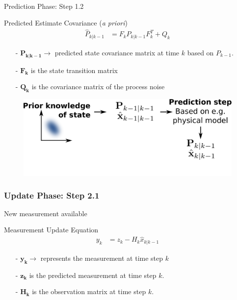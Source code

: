 \documentclass[aspectratio=169,hyperref={pdfpagelabels=false}]{beamer}
\begin{document}
\begin{frame}{Prediction Phase: Step 1.2 }
  
  \begin{block}{Predicted Estimate Covariance (\textit{a priori})}
    \begin{align*}
      \hat{P}_{k|k-1} &= F_{k}P_{k|k-1}F_{k}^T + Q_{k}
      \end{align*}
  \begin{itemize}
    \item[-] $\mathbf{P_{k|k-1}} \rightarrow$ predicted state covariance matrix at time $k$ based on $P_{k-1}$.
    \item[-] $\mathbf{F_{k}}$ is the state transition matrix
    \item[-] $\mathbf{Q_k}$ is the covariance matrix of the process noise
  \end{itemize}
  \end{block}
\end{frame}

\begin{frame}
  \begin{figure}
    \centering
    \includegraphics[width=1\linewidth]{img/4.pdf}
  \end{figure}
\end{frame}

\begin{frame}
  \frametitle{Update Phase: Step 2.1}
  New measurement available
  \begin{block}{Measurement Update Equation}
    \begin{align*}
      y_{k} &= z_{k} - H_{k}\hat{x}_{k|k-1}
      \end{align*}
      \begin{itemize}
        \item[-] $\mathbf{y_k} \rightarrow$ represents the measurement at time step $k$
        \item[-] $\mathbf{z_k}$ is the predicted measurement at time step $k$.
        \item[-] $\mathbf{H_k}$ is the observation matrix at time step $k$.
      \end{itemize}
  \end{block}
\end{frame}
\end{document}
